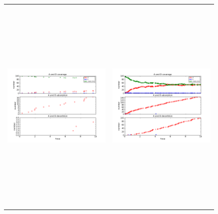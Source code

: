 \documentclass[11pt]{article}
\begin{document}
\setlength{\unitlength}{1in}
\begin{figure}[h!]
\begin{tabular}{cc}
\includegraphics[width=3.5in, height=4.2in]{./coadsorb/AtoBcoadsorb10x10_101_Babs2x__EA5E3_EB10E3_1.png} &
\includegraphics[width=3.5in, height=4.2in]{./coadsorb/AtoBcoadsorb10x10_201_Babs2x__EA5E3_EB10E3_1.png} \\

\end{tabular}
\end{figure}
\end{document}
